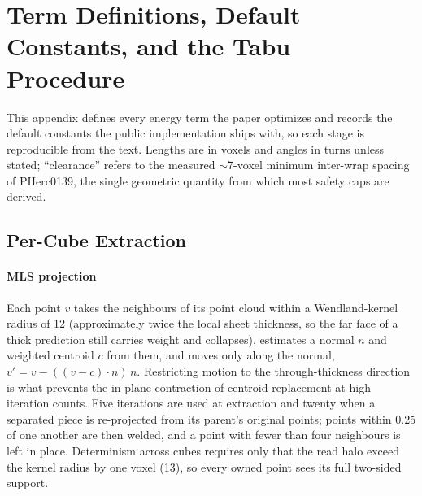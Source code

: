 \section{Term Definitions, Default Constants, and the Tabu Procedure}
\label{app:terms}

This appendix defines every energy term the paper optimizes and records the default constants the public implementation ships with, so each stage is reproducible from the text. Lengths are in voxels and angles in turns unless stated; ``clearance'' refers to the measured $\sim$7-voxel minimum inter-wrap spacing of PHerc0139, the single geometric quantity from which most safety caps are derived.

\subsection{Per-Cube Extraction}
\label{app:extraction}

\paragraph{MLS projection} Each point $v$ takes the neighbours of its point cloud within a Wendland-kernel radius of 12 (approximately twice the local sheet thickness, so the far face of a thick prediction still carries weight and collapses), estimates a normal $n$ and weighted centroid $c$ from them, and moves only along the normal, $v' = v - ((v-c)\cdot n)\,n$. Restricting motion to the through-thickness direction is what prevents the in-plane contraction of centroid replacement at high iteration counts. Five iterations are used at extraction and twenty when a separated piece is re-projected from its parent's original points; points within 0.25 of one another are then welded, and a point with fewer than four neighbours is left in place. Determinism across cubes requires only that the read halo exceed the kernel radius by one voxel (13), so every owned point sees its full two-sided support.

